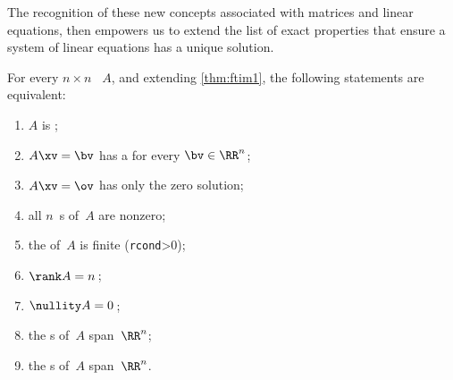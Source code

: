 The recognition of these new concepts associated with matrices and linear equations, then empowers us to extend the list of exact properties that ensure a system of linear equations has a unique solution. 

\begin{theorem}  \label{thm:ftim2} 
For every \(n\times n\) ~\(A\), and extending \autoref{thm:ftim1}, the following statements are equivalent:
\begin{enumerate}
\item\label{thm:ftim2i} \(A\) is ;
\item\label{thm:ftim2ii} \(A\xv=\bv\) has a  for every \(\bv\in\RR^n\);
\item\label{thm:ftim2iii} \(A\xv=\ov\) has only the zero solution;
\item\label{thm:ftim2iv} all \(n\)~s of~\(A\) are nonzero;
\item\label{thm:ftim2ivx} the  of~\(A\) is finite (\verb|rcond|>0);
\item\label{thm:ftim2v} \(\rank A=n\)\,;
\item\label{thm:ftim2vi} \(\nullity A=0\)\,;
\item\label{thm:ftim2vii} the s of~\(A\) span~\(\RR^n\);
\item\label{thm:ftim2viii} the s of~\(A\) span~\(\RR^n\).
\end{enumerate}
\end{theorem}
